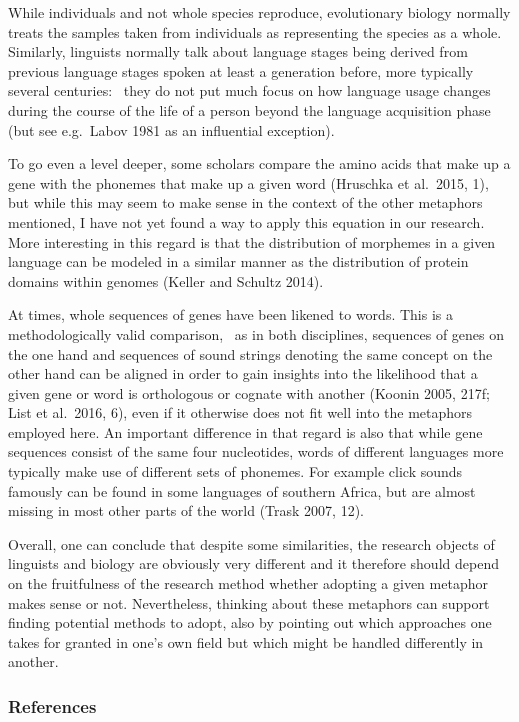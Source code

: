 \documentclass[
  a4paper,
  14pt,
  oneside,
  tablecaptionabove
]{scrbook}
\begin{document}
While individuals and not whole species reproduce, evolutionary biology
normally treats the samples taken from individuals as representing the
species as a whole. Similarly, linguists normally talk about language
stages being derived from previous language stages spoken at least a
generation before, more typically several centuries:~ they do not put
much focus on how language usage changes during the course of the life
of a person beyond the language acquisition phase (but see e.g.~Labov
1981 as an influential exception).

To go even a level deeper, some scholars compare the amino acids that
make up a gene with the phonemes that make up a given word (Hruschka et
al.~2015, 1), but while this may seem to make sense in the context of
the other metaphors mentioned, I have not yet found a way to apply this
equation in our research. More interesting in this regard is that the
distribution of morphemes in a given language can be modeled in a
similar manner as the distribution of protein domains within genomes
(Keller and Schultz 2014).

At times, whole sequences of genes have been likened to words. This is a
methodologically valid comparison,~ as in both disciplines, sequences of
genes on the one hand and sequences of sound strings denoting the same
concept on the other hand can be aligned in order to gain insights into
the likelihood that a given gene or word is orthologous or cognate with
another (Koonin 2005, 217f; List et al.~2016, 6), even if it otherwise
does not fit well into the metaphors employed here. An important
difference in that regard is also that while gene sequences consist of
the same four nucleotides, words of different languages more typically
make use of different sets of phonemes. For example click sounds
famously can be found in some languages of southern Africa, but are
almost missing in most other parts of the world (Trask 2007, 12).

Overall, one can conclude that despite some similarities, the research
objects of linguists and biology are obviously very different and it
therefore should depend on the fruitfulness of the research method
whether adopting a given metaphor makes sense or not. Nevertheless,
thinking about these metaphors can support finding potential methods to
adopt, also by pointing out which approaches one takes for granted in
one's own field but which might be handled differently in another.

\hypertarget{references-7}{%
\subsubsection*{References}\label{references-7}}
\end{document}
